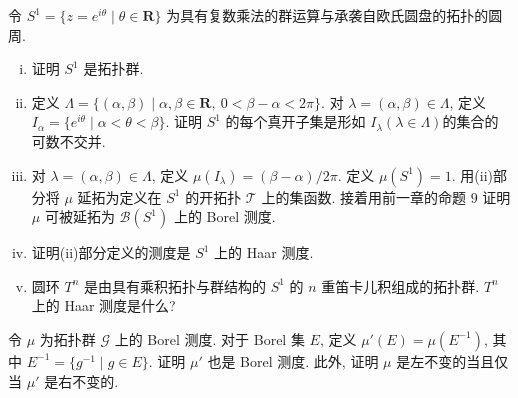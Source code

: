 \documentclass[../../main.tex]{subfiles}
\begin{document}
\begin{exercise}\label{exercise:ch22-24}
令 $S^{1}=\{z=e^{i\theta}\mid\theta\in\mathbf{R}\}$ 为具有复数乘法的群运算与承袭自欧氏圆盘的拓扑的圆周.
\begin{enumerate}[(i)]
\item 证明 $S^{1}$ 是拓扑群.
\item 定义 $\Lambda=\{(\alpha,\beta)\mid\alpha,\beta\in\mathbf{R},\ 0<\beta-\alpha<2\pi\}$. 对 $\lambda=(\alpha,\beta)\in\Lambda$, 定义 $I_{\alpha}=\{e^{i\theta}\mid\alpha<\theta<\beta\}$. 证明 $S^{1}$ 的每个真开子集是形如 $I_{\lambda}(\lambda\in\Lambda)$的集合的可数不交并.
\item 对 $\lambda=(\alpha,\beta)\in\Lambda$, 定义 $\mu(I_{\lambda})=(\beta-\alpha)/2\pi$. 定义 $\mu(S^{1})=1$. 用(ii)部分将 $\mu$ 延拓为定义在 $S^{1}$ 的开拓扑 $\mathcal{T}$ 上的集函数. 接着用前一章的命题 $9$ 证明 $\mu$ 可被延拓为 $\mathcal{B}(S^{1})$ 上的 Borel 测度.
\item 证明(ii)部分定义的测度是 $S^{1}$ 上的 Haar 测度.
\item 圆环 $T^{n}$ 是由具有乘积拓扑与群结构的 $S^{1}$ 的 $n$ 重笛卡儿积组成的拓扑群. $T^{n}$ 上的 Haar 测度是什么?
\end{enumerate}
\end{exercise}

\begin{exercise}\label{exercise:ch22-25}
令 $\mu$ 为拓扑群 $\mathcal{G}$ 上的 Borel 测度. 对于 Borel 集 $E$, 定义 $\mu'(E)=\mu(E^{-1})$, 其中 $E^{-1}=\{g^{-1}\mid g\in E\}$. 证明 $\mu'$ 也是 Borel 测度. 此外, 证明 $\mu$ 是左不变的当且仅当 $\mu'$ 是右不变的.
\end{exercise}
\end{document}
